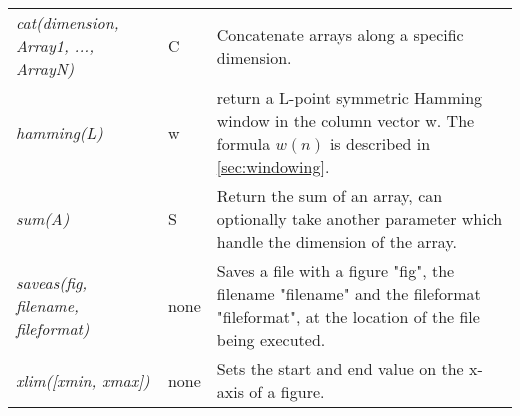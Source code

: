 \begin{longtabu}{>{\em}X l X}
cat(dimension, Array1, ..., ArrayN) & C & Concatenate arrays along a specific dimension.  \\
hamming(L) & w & return a L-point symmetric Hamming window in the column vector w. The formula $w(n)$ is described in \cref{sec:windowing}. \\
sum(A) & S & Return the sum of an array, can optionally take another parameter which handle the dimension of the array. \\
saveas(fig, filename, fileformat) & none & Saves a file with a figure "fig", the filename "filename" and the fileformat "fileformat", at the location of the file being executed. \\
xlim([xmin, xmax]) & none & Sets the start and end value on the x-axis of a figure. \\
\end{longtabu}
